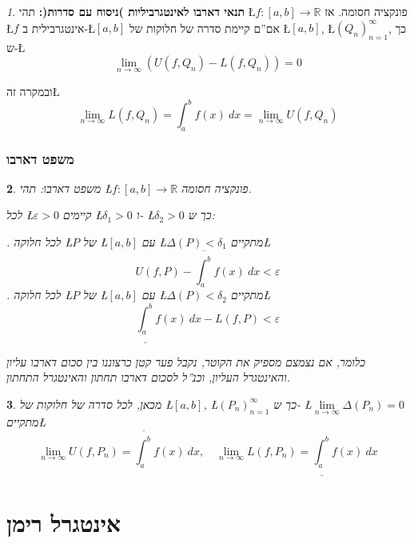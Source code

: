 \documentclass[english,hebrew]{article}
\theoremstyle{remark}
\theoremstyle{definition}
\theoremstyle{plain}
\newtheorem{thm}{\protect\theoremname}
\theoremstyle{remark}
\newtheorem{claim}[thm]{\protect\claimname}
\theoremstyle{plain}
\newtheorem{cor}[thm]{\protect\corollaryname}
\theoremstyle{plain}
\providecommand{\claimname}{טענה}
\providecommand{\corollaryname}{מסקנה}
\providecommand{\theoremname}{משפט}
\begin{document}
\begin{claim}
\textbf{תנאי דארבו לאינטגרביליות )ניסוח עם סדרות(: }תהי \L{$f:\left[a,b\right]\rightarrow\mathbb{R}$}
פונקציה חסומה. אז \L{$f$} אינטגרבילית ב-\L{$\left[a,b\right]$} אם\textquotedblright ם
קיימת סדרה של חלוקות של \L{$\left[a,b\right]$}, \L{$\left(Q_{n}\right)_{n=1}^{\infty}$},
כך ש-\L{%
\[
\underset{n\rightarrow\infty}{\lim}\left(U\left(f,Q_{n}\right)-L\left(f,Q_{n}\right)\right)=0
\]
}%

ובמקרה זה\L{%
\[
\underset{n\rightarrow\infty}{\lim}L\left(f,Q_{n}\right)=\int_{a}^{b}f(x)\ dx=\underset{n\rightarrow\infty}{\lim}U\left(f,Q_{n}\right)
\]
}%
\end{claim}

\section{משפט דארבו}
\begin{thm}
משפט דארבו: תהי \L{$f:\left[a,b\right]\rightarrow\mathbb{R}$} פונקציה
חסומה.

לכל \L{$\varepsilon>0$} קיימים \L{$\delta_{1}>0$} ו- \L{$\delta_{2}>0$}
כך ש:

{\endL}. לכל חלוקה \L{$P$} של \L{$\left[a,b\right]$} עם
\L{$\Delta\left(P\right)<\delta_{1}$} מתקיים\L{%
\[
U\left(f,P\right)-\overline{\int_{a}^{b}}f(x)\ dx<\varepsilon
\]
}%
{\endL}. לכל חלוקה \L{$P$} של \L{$\left[a,b\right]$} עם
\L{$\Delta\left(P\right)<\delta_{2}$} מתקיים\L{%
\[
\underline{\int_{a}^{b}}f(x)\ dx-L\left(f,P\right)<\varepsilon
\]
}%

כלומר, אם נצמצם מספיק את הקוטר, נקבל פער קטן כרצוננו בין סכום דארבו
עליון והאינטגרל העליון, וכנ\textquotedblright ל לסכום דארבו תחתון
והאינטגרל התחתון.
\end{thm}

\begin{cor}
מכאן, לכל סדרה של חלוקות של \L{$\left[a,b\right]$}, \L{$\left(P_{n}\right)_{n=1}^{\infty}$}
כך ש- \L{$\underset{n\rightarrow\infty}{\lim}\Delta\left(P_{n}\right)=0$}
מתקיים\L{%
\[
\underset{n\rightarrow\infty}{\lim}U\left(f,P_{n}\right)=\overline{\int_{a}^{b}}f(x)\ dx,\quad\underset{n\rightarrow\infty}{\lim}L\left(f,P_{n}\right)=\underline{\int_{a}^{b}}f(x)\ dx
\]
}%
\end{cor}

\part{אינטגרל רימן}
\end{document}
